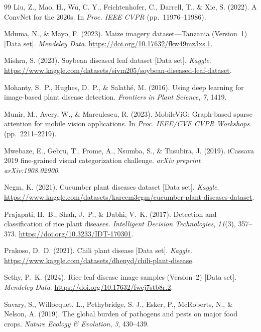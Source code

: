 \documentclass[]{interact}
\theoremstyle{plain}
\theoremstyle{definition}
\theoremstyle{remark}
\begin{document}
\begin{thebibliography}{99}
Liu, Z., Mao, H., Wu, C. Y., Feichtenhofer, C., Darrell, T., \& Xie, S. (2022). A ConvNet for the 2020s. In \emph{Proc. IEEE CVPR} (pp.~11976--11986).

Mduma, N., \& Mayo, F. (2023). Maize imagery dataset---Tanzania (Version~1) [Data set]. \emph{Mendeley Data}. \url{https://doi.org/10.17632/fkw49mz3xs.1}.

Mishra, S. (2023). Soybean diseased leaf dataset [Data set]. \emph{Kaggle}. \url{https://www.kaggle.com/datasets/sivm205/soybean-diseased-leaf-dataset}.

Mohanty, S.~P., Hughes, D.~P., \& Salath\'{e}, M. (2016). Using deep learning for image-based plant disease detection. \emph{Frontiers in Plant Science}, \emph{7}, 1419.

Munir, M., Avery, W., \& Marculescu, R. (2023). MobileViG: Graph-based sparse attention for mobile vision applications. In \emph{Proc. IEEE/CVF CVPR Workshops} (pp.~2211--2219).

Mwebaze, E., Gebru, T., Frome, A., Nsumba, S., \& Tusubira, J. (2019). iCassava 2019 fine-grained visual categorization challenge. \emph{arXiv preprint arXiv:1908.02900}.

Negm, K. (2021). Cucumber plant diseases dataset [Data set]. \emph{Kaggle}. \url{https://www.kaggle.com/datasets/kareem3egm/cucumber-plant-diseases-dataset}.

Prajapati, H.~B., Shah, J.~P., \& Dabhi, V.~K. (2017). Detection and classification of rice plant diseases. \emph{Intelligent Decision Technologies}, \emph{11}(3), 357--373. \url{https://doi.org/10.3233/IDT-170301}.

Prakoso, D.~D. (2021). Chili plant disease [Data set]. \emph{Kaggle}. \url{https://www.kaggle.com/datasets/dhenyd/chili-plant-disease}.

Sethy, P.~K. (2024). Rice leaf disease image samples (Version~2) [Data set]. \emph{Mendeley Data}. \url{https://doi.org/10.17632/fwcj7stb8r.2}.

Savary, S., Willocquet, L., Pethybridge, S. J., Esker, P., McRoberts, N., \& Nelson, A. (2019). The global burden of pathogens and pests on major food crops. \emph{Nature Ecology \& Evolution}, \emph{3}, 430--439.


\end{thebibliography}
\end{document}
